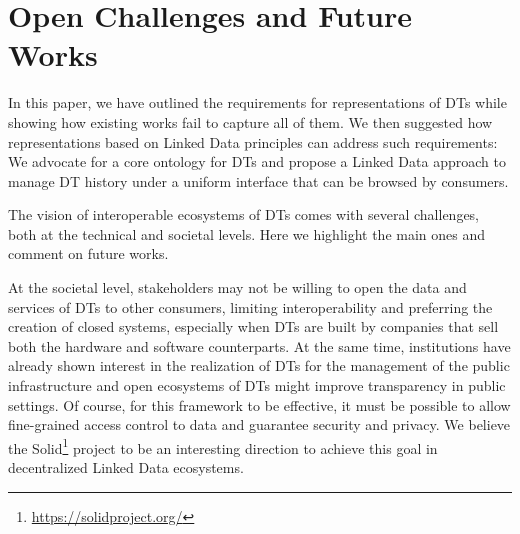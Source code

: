 \section{Open Challenges and Future Works}\label{sec:challenges}

In this paper, we have outlined the requirements for representations of DTs while showing how existing works fail to capture all of them.
We then suggested how representations based on Linked Data principles can address such requirements:
We advocate for a core ontology for DTs and propose a Linked Data approach to manage DT history under a uniform interface that can be browsed by consumers.

The vision of interoperable ecosystems of DTs comes with several challenges, both at the technical and societal levels. Here we highlight the main ones and comment on future works.

At the societal level, stakeholders may not be willing to open the data and services of DTs to other consumers, limiting interoperability and preferring the creation of closed systems, especially when DTs are built by companies that sell both the hardware and software counterparts.
%
%
At the same time, institutions have already shown interest in the realization of DTs for the management of the public infrastructure and open ecosystems of DTs might improve transparency in public settings.
%
Of course, for this framework to be effective, it must be possible to allow fine-grained access control to data and guarantee security and privacy. We believe the Solid\footnote{\url{https://solidproject.org/}} project to be an interesting direction to achieve this goal in decentralized Linked Data ecosystems.

